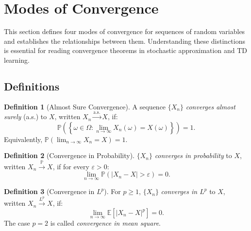 \documentclass[11pt,a4paper]{article}
\theoremstyle{definition}
\newtheorem{definition}{Definition}[section]
\theoremstyle{plain}
\theoremstyle{remark}
\newcommand{\E}{\mathbb{E}}
\newcommand{\Prob}{\mathbb{P}}
\newcommand{\cas}{\xrightarrow{\text{a.s.}}}
\newcommand{\cprob}{\xrightarrow{\Prob}}
\newcommand{\clp}[1]{\xrightarrow{L^{#1}}}
\begin{document}
\section{Modes of Convergence}
\label{sec:convergence}

This section defines four modes of convergence for sequences of random variables and establishes the relationships between them. Understanding these distinctions is essential for reading convergence theorems in stochastic approximation and TD learning.

\subsection{Definitions}
\label{subsec:conv_def}

\begin{definition}[Almost Sure Convergence]
\label{def:as_conv}
A sequence $\{X_n\}$ \emph{converges almost surely} (a.s.) to $X$, written $X_n \cas X$, if:
\begin{equation}
    \Prob\!\left(\left\{\omega \in \Omega : \lim_{n \to \infty} X_n(\omega) = X(\omega)\right\}\right) = 1.
    \label{eq:as_conv}
\end{equation}
Equivalently, $\Prob\!\left(\lim_{n \to \infty} X_n = X\right) = 1$.
\end{definition}

\begin{definition}[Convergence in Probability]
\label{def:prob_conv}
$\{X_n\}$ \emph{converges in probability} to $X$, written $X_n \cprob X$, if for every $\varepsilon > 0$:
\begin{equation}
    \lim_{n \to \infty} \Prob(|X_n - X| > \varepsilon) = 0.
    \label{eq:prob_conv}
\end{equation}
\end{definition}

\begin{definition}[Convergence in $L^p$]
\label{def:lp_conv}
For $p \geq 1$, $\{X_n\}$ \emph{converges in $L^p$} to $X$, written $X_n \clp{p} X$, if:
\begin{equation}
    \lim_{n \to \infty} \E\!\left[|X_n - X|^p\right] = 0.
    \label{eq:lp_conv}
\end{equation}
The case $p = 2$ is called \emph{convergence in mean square}.
\end{definition}
\end{document}
